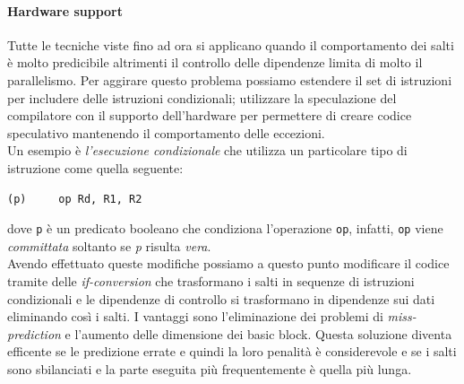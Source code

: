 \paragraph{Hardware support}
Tutte le tecniche viste fino ad ora si applicano quando il comportamento dei salti è molto predicibile altrimenti il controllo delle dipendenze limita di molto il parallelismo. Per aggirare questo problema possiamo estendere il set di istruzioni per includere delle istruzioni condizionali; utilizzare la speculazione del compilatore con il supporto dell'hardware per permettere di creare codice speculativo mantenendo il comportamento delle eccezioni.\\
Un esempio è \emph{l'esecuzione condizionale} che utilizza un particolare tipo di istruzione come quella seguente:
\begin{verbatim}
(p)     op Rd, R1, R2
\end{verbatim}
dove \texttt{p} è un predicato booleano che condiziona l'operazione \texttt{op}, infatti, \texttt{op} viene \emph{committata} soltanto se \emph{p} risulta \emph{vera}.\\
Avendo effettuato queste modifiche possiamo a questo punto modificare il codice tramite delle \emph{if-conversion} che trasformano i salti in sequenze di istruzioni condizionali e le dipendenze di controllo si trasformano in dipendenze sui dati eliminando così i salti. I vantaggi sono l'eliminazione dei problemi di \emph{miss-prediction} e l'aumento delle dimensione dei basic block. Questa soluzione diventa efficente se le predizione errate e quindi la loro penalità è considerevole e se i salti sono sbilanciati e la parte eseguita più frequentemente è quella più lunga.
